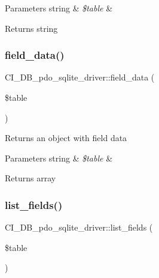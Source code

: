 \begin{DoxyParams}[1]{Parameters}
string & {\em \$table} & \\
\hline
\end{DoxyParams}
\begin{DoxyReturn}{Returns}
string 
\end{DoxyReturn}
\mbox{\label{class_c_i___d_b__pdo__sqlite__driver_a2a13916cb4ab3e46199526b06a2b48a9}} 
\subsubsection{\texorpdfstring{field\+\_\+data()}{field\_data()}}
{\footnotesize\ttfamily C\+I\+\_\+\+D\+B\+\_\+pdo\+\_\+sqlite\+\_\+driver\+::field\+\_\+data (\begin{DoxyParamCaption}\item[{}]{\$table }\end{DoxyParamCaption})}

Returns an object with field data


\begin{DoxyParams}[1]{Parameters}
string & {\em \$table} & \\
\hline
\end{DoxyParams}
\begin{DoxyReturn}{Returns}
array 
\end{DoxyReturn}
\mbox{\label{class_c_i___d_b__pdo__sqlite__driver_a59db8812b869c0806cab617a706f0397}} 
\subsubsection{\texorpdfstring{list\+\_\+fields()}{list\_fields()}}
{\footnotesize\ttfamily C\+I\+\_\+\+D\+B\+\_\+pdo\+\_\+sqlite\+\_\+driver\+::list\+\_\+fields (\begin{DoxyParamCaption}\item[{}]{\$table }\end{DoxyParamCaption})}

